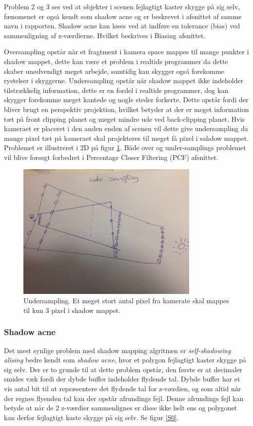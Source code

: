 \documentclass[11pt,a4paper]{article}
\begin{document}
Problem 2 og 3 ses ved at objekter i scenen fejlagtigt kaster skygge på sig selv, fænomenet er også kendt som shadow acne og er beskrevet i afsnittet af samme navn i rapporten. Shadow acne kan løses ved at indføre en tolerance (bias) ved sammenligning af z-værdierne. Hvilket beskrives i Biasing afsnittet.

Oversampling opstår når et fragtment i kamera space mappes til mange punkter i shadow mappet, dette kan være et problem i realtids programmer da dette skaber unødvendigt meget arbejde, samtidig kan skygger også forekomme rystelser i skyggerne. Undersampling opstår når shadow mappet ikke indeholder tilstrækkelig information, dette er en fordel i realtids programmer, dog kan skygger forekomme meget kantede og nogle steder forkerte.  Dette opstår fordi der bliver brugt en perspektiv projektion, hvilket betyder at der er meget information tæt på front clipping planet og meget mindre ude ved back-clipping planet. Hvis kameraet er placeret i den anden enden af scenen vil dette give undersampling da mange pixel tæt på kameraet skal projekteres til meget få pixel i sahdow mappet. Problemet er illustreret i 2D på figur \ref{P2}.  Både over og under-samplings problemet vil blive forsøgt forbedret i Percentage Closer Filtering (PCF) afsnittet.


\begin{figure}[ht!]
\centering
\includegraphics[width=90mm]{img/P2.jpg}
\caption{Undersampling. Et meget stort antal pixel fra kamerate skal mappes til kun 3 pixel i shadow mappet.}
\label{P2}
\end{figure}


\subsubsection{Shadow acne}

Det mest synlige problem med shadow mapping algritmen er \textit{self-shadowing alising} bedre kendt som \textit{shadow acne}, hvor et  polygon fejlagtigt kaster skygge på sig selv. Der er to grunde til at dette problem opstår, den første  er at decimaler smides væk fordi der dybde buffer indeholder flydende tal. Dybde buffer har et vis antal bit til at repræsentere det flydende tal for z-værdien,  og som altid når der regnes flyenden tal kan der opstår afrundings fejl. Denne afrundings fejl kan betyde at når de 2 z-værdier sammenlignes er disse ikke helt ens og polygonet kan derfor fejlagtigt kaste skygge på sig selv.  Se figur \ref{S0}.
\end{document}
